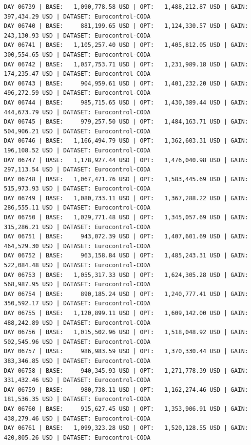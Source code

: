 \documentclass[11pt,a4paper]{article}
\begin{document}
\begin{verbatim}
DAY 06739 | BASE:   1,090,778.58 USD | OPT:   1,488,212.87 USD | GAIN: 397,434.29 USD | DATASET: Eurocontrol-CODA
DAY 06740 | BASE:     881,199.65 USD | OPT:   1,124,330.57 USD | GAIN: 243,130.93 USD | DATASET: Eurocontrol-CODA
DAY 06741 | BASE:   1,105,257.40 USD | OPT:   1,405,812.05 USD | GAIN: 300,554.65 USD | DATASET: Eurocontrol-CODA
DAY 06742 | BASE:   1,057,753.71 USD | OPT:   1,231,989.18 USD | GAIN: 174,235.47 USD | DATASET: Eurocontrol-CODA
DAY 06743 | BASE:     904,959.61 USD | OPT:   1,401,232.20 USD | GAIN: 496,272.59 USD | DATASET: Eurocontrol-CODA
DAY 06744 | BASE:     985,715.65 USD | OPT:   1,430,389.44 USD | GAIN: 444,673.79 USD | DATASET: Eurocontrol-CODA
DAY 06745 | BASE:     979,257.50 USD | OPT:   1,484,163.71 USD | GAIN: 504,906.21 USD | DATASET: Eurocontrol-CODA
DAY 06746 | BASE:   1,166,494.79 USD | OPT:   1,362,603.31 USD | GAIN: 196,108.52 USD | DATASET: Eurocontrol-CODA
DAY 06747 | BASE:   1,178,927.44 USD | OPT:   1,476,040.98 USD | GAIN: 297,113.54 USD | DATASET: Eurocontrol-CODA
DAY 06748 | BASE:   1,067,471.76 USD | OPT:   1,583,445.69 USD | GAIN: 515,973.93 USD | DATASET: Eurocontrol-CODA
DAY 06749 | BASE:   1,080,733.11 USD | OPT:   1,367,288.22 USD | GAIN: 286,555.11 USD | DATASET: Eurocontrol-CODA
DAY 06750 | BASE:   1,029,771.48 USD | OPT:   1,345,057.69 USD | GAIN: 315,286.21 USD | DATASET: Eurocontrol-CODA
DAY 06751 | BASE:     943,072.39 USD | OPT:   1,407,601.69 USD | GAIN: 464,529.30 USD | DATASET: Eurocontrol-CODA
DAY 06752 | BASE:     963,158.84 USD | OPT:   1,485,243.31 USD | GAIN: 522,084.48 USD | DATASET: Eurocontrol-CODA
DAY 06753 | BASE:   1,055,317.33 USD | OPT:   1,624,305.28 USD | GAIN: 568,987.95 USD | DATASET: Eurocontrol-CODA
DAY 06754 | BASE:     890,185.24 USD | OPT:   1,240,777.41 USD | GAIN: 350,592.17 USD | DATASET: Eurocontrol-CODA
DAY 06755 | BASE:   1,120,899.11 USD | OPT:   1,609,142.00 USD | GAIN: 488,242.89 USD | DATASET: Eurocontrol-CODA
DAY 06756 | BASE:   1,015,502.96 USD | OPT:   1,518,048.92 USD | GAIN: 502,545.96 USD | DATASET: Eurocontrol-CODA
DAY 06757 | BASE:     986,983.59 USD | OPT:   1,370,330.44 USD | GAIN: 383,346.85 USD | DATASET: Eurocontrol-CODA
DAY 06758 | BASE:     940,345.93 USD | OPT:   1,271,778.39 USD | GAIN: 331,432.46 USD | DATASET: Eurocontrol-CODA
DAY 06759 | BASE:     980,738.11 USD | OPT:   1,162,274.46 USD | GAIN: 181,536.35 USD | DATASET: Eurocontrol-CODA
DAY 06760 | BASE:     915,627.45 USD | OPT:   1,353,906.91 USD | GAIN: 438,279.46 USD | DATASET: Eurocontrol-CODA
DAY 06761 | BASE:   1,099,323.28 USD | OPT:   1,520,128.55 USD | GAIN: 420,805.26 USD | DATASET: Eurocontrol-CODA

\end{verbatim}
\end{document}
